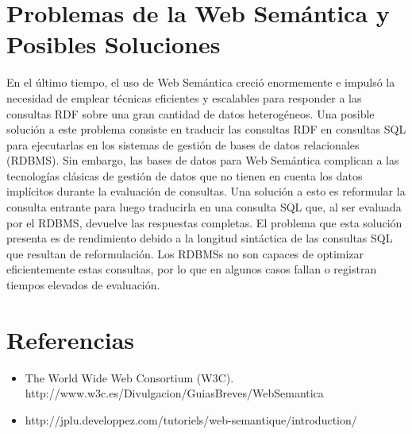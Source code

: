 \documentclass[10pt,a4paper]{article}
\begin{document}
\section{Problemas de la Web Semántica y Posibles Soluciones}
En el último tiempo, el uso de Web Semántica creció enormemente e impulsó la necesidad de emplear técnicas eficientes y escalables para responder a las consultas RDF sobre una gran cantidad de datos heterogéneos. Una posible solución a este problema consiste en traducir las consultas RDF en consultas SQL para ejecutarlas en los sistemas de gestión de bases de datos relacionales (RDBMS). Sin embargo, las bases de datos para Web Semántica complican a las tecnologías clásicas de gestión de datos que no tienen en cuenta los datos implícitos durante la evaluación de consultas. Una solución a esto es reformular la consulta entrante para luego traducirla en una consulta SQL que, al ser evaluada por el RDBMS, devuelve las respuestas completas. El problema que esta solución presenta es de rendimiento debido a la longitud sintáctica de las consultas SQL que resultan de reformulación. Los RDBMSs no son capaces de optimizar eficientemente estas consultas, por lo que en algunos casos fallan o registran tiempos elevados de evaluación.

\section{Referencias}

\begin{itemize}
\item The World Wide Web Consortium (W3C). http://www.w3c.es/Divulgacion/GuiasBreves/WebSemantica
\item http://jplu.developpez.com/tutoriels/web-semantique/introduction/
\end{itemize}
\end{document}

